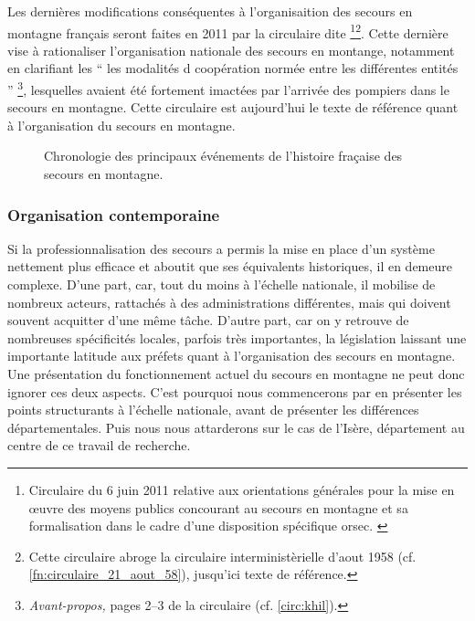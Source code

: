 Les dernières modifications conséquentes à l'organisaition des secours
en montagne français seront faites en 2011 par la circulaire dite
 \footnote{Circulaire du 6 juin 2011 relative aux
  orientations générales pour la mise en œuvre des moyens publics
  concourant au secours en montagne et sa formalisation dans le cadre
  d’une disposition spécifique
  \ac{orsec}. \label{circ:khil}}\multiplefootnoteseparator\footnote{Cette
  circulaire abroge la circulaire interministèrielle d'aout 1958
  (cf. \autoref{fn:circulaire_21_aout_58}), jusqu'ici texte de
  référence.}. Cette dernière vise à rationaliser l'organisation
nationale des secours en montange, notamment en clarifiant les
\enquote{\textelp{} les modalités d coopération normée
  entre les différentes entités \textelp{}}
\footnote{\emph{Avant-propos,} pages 2--3 de la circulaire 
  (cf. \autoref{circ:khil}).}, lesquelles avaient été fortement
imactées par l'arrivée des pompiers dans le secours en montagne. Cette
circulaire est aujourd'hui le texte de référence quant à
l'organisation du secours en montagne.

\begin{figure}
  \centering
   
   \caption{Chronologie des principaux événements de
     l'histoire fraçaise des secours en montagne.}
  \label{fig:frise_chronologique}
\end{figure}

\subsubsection{Organisation contemporaine}
\label{subsubsec:1-1-1-2}

Si la professionnalisation des secours a permis la mise en place d'un
système nettement plus efficace et aboutit que ses équivalents
historiques, il en demeure complexe. D'une part, car, tout du moins à
l'échelle nationale, il mobilise de nombreux acteurs, rattachés à des
administrations différentes, mais qui doivent souvent acquitter d'une
même tâche. D'autre part, car on y retrouve de nombreuses spécificités
locales, parfois très importantes, la législation laissant une
importante latitude aux préfets quant à l'organisation des secours en
montagne. Une présentation du fonctionnement actuel du secours en
montagne ne peut donc ignorer ces deux aspects. C'est pourquoi nous
commencerons par en présenter les points structurants à l'échelle
nationale, avant de présenter les différences départementales. Puis
nous nous attarderons sur le cas de l'Isère, département au centre de
ce travail de recherche.

